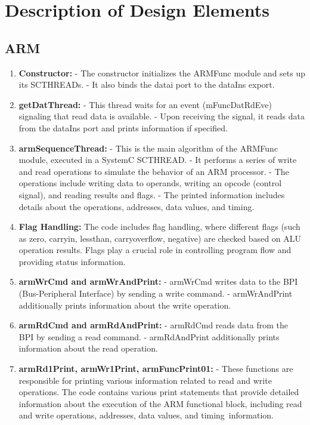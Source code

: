 \documentclass[a4paper,12pt,english]{report}
\begin{document}
\chapter{Description of Design Elements}
\section{ARM}
\begin{enumerate}
    \item \textbf{Constructor:}
   - The constructor initializes the ARMFunc module and sets up its SC\textunderscore THREADs.
   - It also binds the data\textunderscore i port to the dataIn\textunderscore s export.
   \item \textbf{getDatThread:}
   - This thread waits for an event (mFuncDatRdEv\textunderscore e) signaling that read data is available.
   - Upon receiving the signal, it reads data from the dataIn\textunderscore s port and prints information if    specified.
   \item \textbf{armSequenceThread:}
   - This is the main algorithm of the ARMFunc module, executed in a SystemC SC\textunderscore THREAD.
   - It performs a series of write and read operations to simulate the behavior of an ARM processor.
   - The operations include writing data to operands, writing an opcode (control signal), and reading results and flags.
   - The printed information includes details about the operations, addresses, data values, and timing.
  \item \textbf{Flag Handling:}
The code includes flag handling, where different flags (such as zero, carryin, lessthan, carryoverflow, negative) are checked based on ALU operation results. Flags play a crucial role in controlling program flow and providing status information.
\item \textbf{armWrCmd and armWrAndPrint:}
   - armWrCmd writes data to the BPI (Bus-Peripheral Interface) by sending a write command.
   - armWrAndPrint additionally prints information about the write operation.

 \item \textbf{armRdCmd and armRdAndPrint:}
   - armRdCmd reads data from the BPI by sending a read command.
   - armRdAndPrint additionally prints information about the read operation.

  \item \textbf{armRd1Print, armWr1Print, armFuncPrint01:}
   - These functions are responsible for printing various information related to read and write operations. The code contains various print statements that provide detailed information about the execution of the ARM functional block, including read and write operations, addresses, data values, and timing information.
\end{enumerate}
\end{document}
